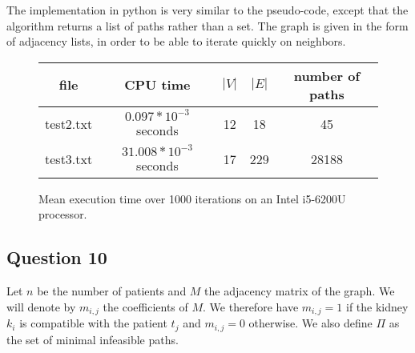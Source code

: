 \documentclass[english]{article}
\begin{document}
The implementation in python is very similar to the pseudo-code, except that the algorithm returns a list of paths rather than a set. The graph is given in the form of adjacency lists, in order to be able to iterate quickly on neighbors.

\begin{figure}[ht]
    \centering
    \begin{tabular}{|c|c|c|c|c|}
        \hline
        file & CPU time & $|V|$ & $|E|$ & number of paths \\
        \hline
        test2.txt & $0.097 * 10^{-3}$ seconds & 12 & 18 & 45 \\
        test3.txt & $31.008 * 10^{-3}$ seconds & 17 & 229 & 28188 \\
        \hline
    \end{tabular}
    \caption{Mean execution time over 1000 iterations on an Intel i5-6200U processor.}
\end{figure}

\subsection*{Question 10}

Let $n$ be the number of patients and $M$ the adjacency matrix of the graph. We will denote by $ m_ {i, j} $ the coefficients of $M$. We therefore have $m_{i, j} = 1$ if the kidney $k_i$ is compatible with
the patient $t_j$ and $m_{i, j} = 0$ otherwise. We also define $\Pi$ as the set of minimal infeasible paths. 
\end{document}
